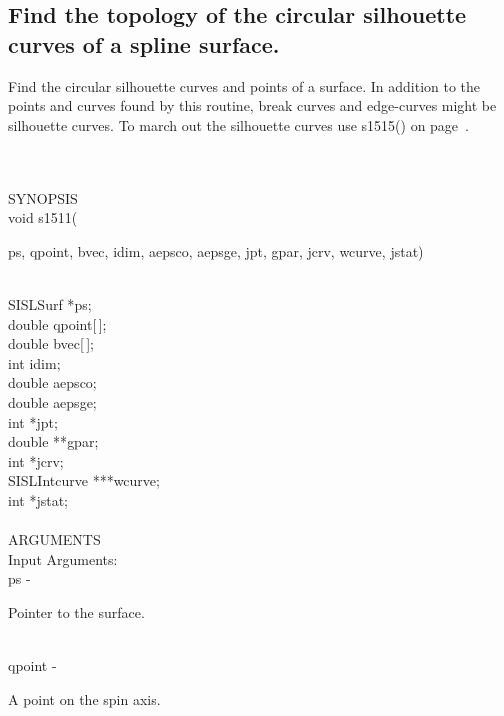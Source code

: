 \subsection{Find the topology of the circular silhouette curves of a spline
\mbox{surface}.}
\begin{minipg1}
  Find the circular silhouette curves and points of a surface.
  In addition to the points and curves found by this routine,
  break curves and edge-curves might be silhouette curves.
  To march out the silhouette curves use s1515() on page~\pageref{s1515}.
\end{minipg1} \\ \\
SYNOPSIS\\
        \> void s1511(\begin{minipg3}
          {\fov ps}, {\fov qpoint}, {\fov bvec}, {\fov idim}, {\fov aepsco}, {\fov aepsge}, {\fov jpt},  {\fov gpar},  {\fov jcrv},  {\fov wcurve},  {\fov jstat})
        \end{minipg3}\\[0.3ex]
        \>\>    SISLSurf \> *{\fov ps};\\
        \>\>    double   \> {\fov qpoint}[\,];\\
        \>\>    double   \> {\fov bvec}[\,];\\
        \>\>    int      \> {\fov idim};\\
        \>\>    double   \> {\fov aepsco};\\
        \>\>    double   \> {\fov aepsge};\\
        \>\>    int      \> *{\fov jpt};\\
        \>\>    double   \> **{\fov gpar};\\
        \>\>    int      \> *{\fov jcrv};\\
        \>\>    SISLIntcurve \> ***{\fov wcurve};\\
        \>\>    int      \> *{\fov jstat};\\
\\
ARGUMENTS\\
        \>Input Arguments:\\
        \>\>    {\fov ps}\> - \>  \begin{minipg2}
                          Pointer to the surface.
                               \end{minipg2}\\
        \>\>    {\fov qpoint}\> - \>  \begin{minipg2}
                       A point on the spin axis.
                               \end{minipg2}\\

